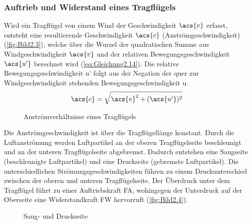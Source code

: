 \subsubsection{Auftrieb und Widerstand eines Tragflügels}
Wird ein Tragflügel von einem Wind der Geschwindigkeit $\acs{v}$ erfasst, entsteht eine resultierende Geschwindigkeit $\acs{c}$ (Anströmgeschwindigkeit) (\autoref{fig:Bild2.3}), welche über die Wurzel der quadratischen Summe aus Windgeschwindigkeit $\acs{v}$ und der relativen Bewegungsgeschwindigkeit $\acs{u'}$ berechnet wird (\autoref{eq:Gleichung2.14}). Die relative Bewegungsgeschwindigkeit \acs{u'} folgt aus der Negation der quer zur Windgeschwindigkeit stehenden Bewegungsgeschwindigkeit \acs{u}.
\begin{align} \label{eq:Gleichung2.14}
    \acs{c} = \sqrt{\acs{v}^2 + (\acs{u'})^2}
\end{align}
\begin{figure}[H]
   \centering
   \caption[Anströmverhältnisse eines Tragflügels]{Anströmverhältnisse eines Tragflügels \cite{SkriptSchulte}}
   \label{fig:Bild2.3}
\end{figure}

Die Anströmgeschwindigkeit ist über die Tragflügellänge konstant. Durch die Luftanströmung werden Luftpartikel an der oberen Tragflügelseite beschleunigt und an der unteren Tragflügelseite abgebremst. Dadurch entstehen eine Saugseite (beschleunigte Luftpartikel) und eine Druckseite (gebremste Luftpartikel). Die unterschiedlichen Strömungsgeschwindigkeiten führen zu einem Druckunterschied zwischen der oberen und unteren Tragflügelseite. Der Überdruck unter dem Tragflügel führt zu einer Auftriebskraft \acs{FA}, wohingegen der Unterdruck auf der Oberseite eine Widerstandkraft \acs{FW} hervorruft (\autoref{fig:Bild2.4}).
\begin{figure}[H]
   \centering
   \caption[Saug- und Druckseite]{Saug- und Druckseite \cite{SkriptSchulte}}
   \label{fig:Bild2.4}
\end{figure}
\newpage
